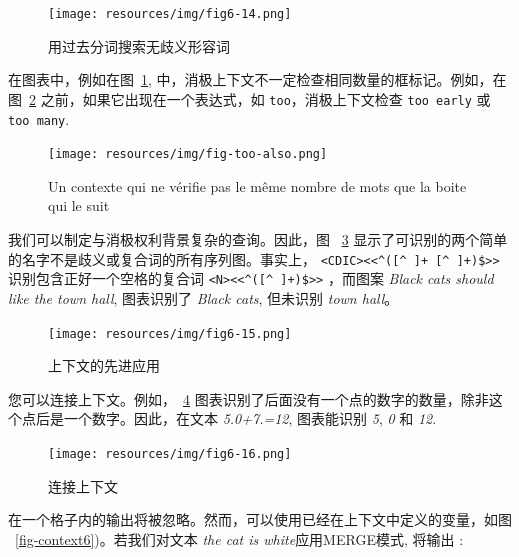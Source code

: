 \begin{figure}[!h]
\begin{center}
\texttt{[image: resources/img/fig6-14.png]}
\caption{用过去分词搜索无歧义形容词\label{fig-context3}}
\end{center}
\end{figure}

\bigskip
\noindent 在图表中，例如在图~\ref{fig-context3}, 中，消极上下文不一定检查相同数量的框标记。例如，在图~\ref{too-also} 之前，如果它出现在一个表达式，如 \verb+too+，消极上下文检查 \verb+too early+ 或 \verb+too many+.

\begin{figure}[!h]
\begin{center}
\texttt{[image: resources/img/fig-too-also.png]}
\caption{Un contexte qui ne vérifie pas le même nombre de mots que la boite qui le suit\label{too-also}}
\end{center}
\end{figure}

\bigskip
\noindent 我们可以制定与消极权利背景复杂的查询。因此，图
~\ref{fig-context4} 显示了可识别的两个简单的名字不是歧义或复合词的所有序列图。事实上， \verb?<CDIC><<^([^ ]+ [^ ]+)$>>? 
识别包含正好一个空格的复合词 \verb?<N><<^([^ ]+)$>>?
，而图案 \textit{Black cats should like the town hall}, 图表识别了
 \textit{Black cats}, 但未识别 \textit{town hall}。

\bigskip
\begin{figure}[!h]
\begin{center}
\texttt{[image: resources/img/fig6-15.png]}
\caption{上下文的先进应用\label{fig-context4}}
\end{center}
\end{figure}

\bigskip
\noindent 您可以连接上下文。例如，~\ref{fig-context5}
图表识别了后面没有一个点的数字的数量，除非这个点后是一个数字。因此，在文本 \textit{5.0+7.=12}, 图表能识别 \textit{5}, \textit{0} 和
\textit{12}.

\bigskip
\begin{figure}[!h]
\begin{center}
\texttt{[image: resources/img/fig6-16.png]}
\caption{连接上下文\label{fig-context5}}
\end{center}
\end{figure}

\bigskip
\noindent 在一个格子内的输出将被忽略。然而，可以使用已经在上下文中定义的变量，如图 ~\ref{fig-context6})。若我们对文本
\textit{the cat is white}应用MERGE模式, 将输出 :

